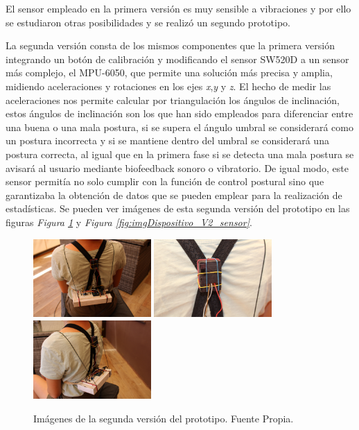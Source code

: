 El sensor empleado en la primera versión es muy sensible a vibraciones y por ello se estudiaron otras posibilidades y se realizó un segundo prototipo.

La segunda versión consta de los mismos componentes que la primera versión integrando un botón de calibración y modificando el sensor SW520D\cite{SW520D_1} a un sensor más complejo, el MPU-6050\cite{MPU6050_1,MPU6050_2}, que permite una solución más precisa y amplia, midiendo aceleraciones y rotaciones en los ejes \textit{x},\textit{y} y \textit{z}. El hecho de medir las aceleraciones nos permite calcular por triangulación los ángulos de inclinación, estos ángulos de inclinación son los que han sido empleados para diferenciar entre una buena o una mala postura, si se supera el ángulo umbral se considerará como un postura incorrecta y si se mantiene dentro del umbral se considerará una postura correcta, al igual que en la primera fase si se detecta una mala postura se avisará al usuario mediante biofeedback sonoro o vibratorio. De igual modo, este sensor permitía no solo cumplir con la función de control postural sino que garantizaba la obtención de datos que se pueden emplear para la realización de estadísticas. Se pueden ver imágenes de esta segunda versión del prototipo en las figuras \textit{Figura \ref{fig:imgDispositivo_V2}} y \textit{Figura \ref{fig:imgDispositivo_V2_sensor}}.

\begin{figure}[h!]
    \centering
    \includegraphics[width=0.4\textwidth]{img/Disp_V2_1.jpg}
    \includegraphics[width=0.4\textwidth]{img/Disp_V2_2.jpg}
    \includegraphics[width=0.4\textwidth]{img/Disp_V2_3.jpg}
    \caption{Imágenes de la segunda versión del prototipo. Fuente Propia.}
    \label{fig:imgDispositivo_V2} 
\end{figure}

